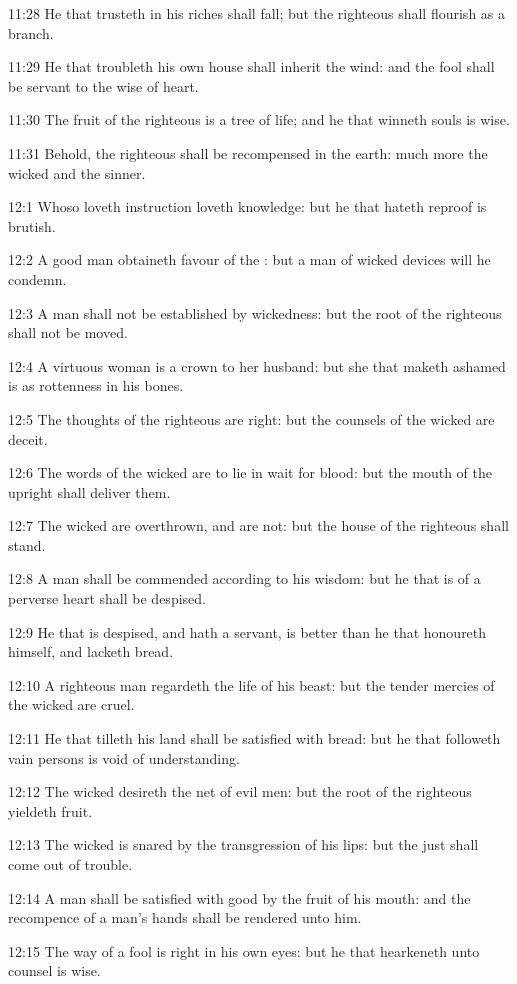 11:28 He that trusteth in his riches shall fall; but the righteous shall flourish as a branch.

11:29 He that troubleth his own house shall inherit the wind: and the fool shall be servant to the wise of heart.

11:30 The fruit of the righteous is a tree of life; and he that winneth souls is wise.

11:31 Behold, the righteous shall be recompensed in the earth: much more the wicked and the sinner.

12:1 Whoso loveth instruction loveth knowledge: but he that hateth reproof is brutish.

12:2 A good man obtaineth favour of the \LORD: but a man of wicked devices will he condemn.

12:3 A man shall not be established by wickedness: but the root of the righteous shall not be moved.

12:4 A virtuous woman is a crown to her husband: but she that maketh ashamed is as rottenness in his bones.

12:5 The thoughts of the righteous are right: but the counsels of the wicked are deceit.

12:6 The words of the wicked are to lie in wait for blood: but the mouth of the upright shall deliver them.

12:7 The wicked are overthrown, and are not: but the house of the righteous shall stand.

12:8 A man shall be commended according to his wisdom: but he that is of a perverse heart shall be despised.

12:9 He that is despised, and hath a servant, is better than he that honoureth himself, and lacketh bread.

12:10 A righteous man regardeth the life of his beast: but the tender mercies of the wicked are cruel.

12:11 He that tilleth his land shall be satisfied with bread: but he that followeth vain persons is void of understanding.

12:12 The wicked desireth the net of evil men: but the root of the righteous yieldeth fruit.

12:13 The wicked is snared by the transgression of his lips: but the just shall come out of trouble.

12:14 A man shall be satisfied with good by the fruit of his mouth: and the recompence of a man's hands shall be rendered unto him.

12:15 The way of a fool is right in his own eyes: but he that hearkeneth unto counsel is wise.

